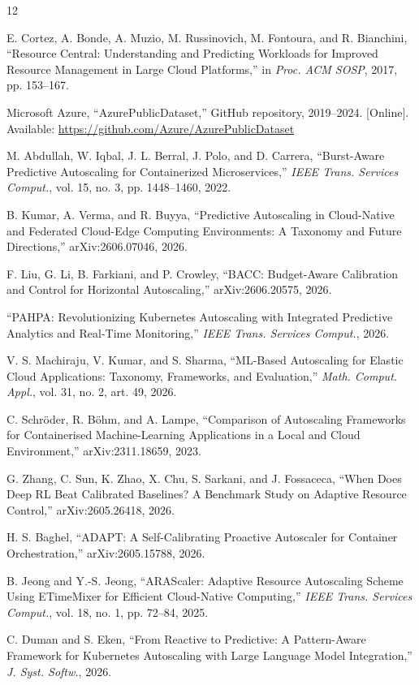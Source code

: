 \documentclass[journal]{IEEEtran}
\begin{document}
\begin{thebibliography}{12}

E. Cortez, A. Bonde, A. Muzio, M. Russinovich, M. Fontoura, and R. Bianchini, ``Resource Central: Understanding and Predicting Workloads for Improved Resource Management in Large Cloud Platforms,'' in \emph{Proc. ACM SOSP}, 2017, pp. 153--167.

Microsoft Azure, ``AzurePublicDataset,'' GitHub repository, 2019--2024. [Online]. Available: \url{https://github.com/Azure/AzurePublicDataset}

M. Abdullah, W. Iqbal, J. L. Berral, J. Polo, and D. Carrera, ``Burst-Aware Predictive Autoscaling for Containerized Microservices,'' \emph{IEEE Trans. Services Comput.}, vol. 15, no. 3, pp. 1448--1460, 2022.

B. Kumar, A. Verma, and R. Buyya, ``Predictive Autoscaling in Cloud-Native and Federated Cloud-Edge Computing Environments: A Taxonomy and Future Directions,'' arXiv:2606.07046, 2026.

F. Liu, G. Li, B. Farkiani, and P. Crowley, ``BACC: Budget-Aware Calibration and Control for Horizontal Autoscaling,'' arXiv:2606.20575, 2026.

``PAHPA: Revolutionizing Kubernetes Autoscaling with Integrated Predictive Analytics and Real-Time Monitoring,'' \emph{IEEE Trans. Services Comput.}, 2026.

V. S. Machiraju, V. Kumar, and S. Sharma, ``ML-Based Autoscaling for Elastic Cloud Applications: Taxonomy, Frameworks, and Evaluation,'' \emph{Math. Comput. Appl.}, vol. 31, no. 2, art. 49, 2026.

C. Schr\"oder, R. B\"ohm, and A. Lampe, ``Comparison of Autoscaling Frameworks for Containerised Machine-Learning Applications in a Local and Cloud Environment,'' arXiv:2311.18659, 2023.

G. Zhang, C. Sun, K. Zhao, X. Chu, S. Sarkani, and J. Fossaceca, ``When Does Deep RL Beat Calibrated Baselines? A Benchmark Study on Adaptive Resource Control,'' arXiv:2605.26418, 2026.

H. S. Baghel, ``ADAPT: A Self-Calibrating Proactive Autoscaler for Container Orchestration,'' arXiv:2605.15788, 2026.

B. Jeong and Y.-S. Jeong, ``ARAScaler: Adaptive Resource Autoscaling Scheme Using ETimeMixer for Efficient Cloud-Native Computing,'' \emph{IEEE Trans. Services Comput.}, vol. 18, no. 1, pp. 72--84, 2025.

C. Duman and S. Eken, ``From Reactive to Predictive: A Pattern-Aware Framework for Kubernetes Autoscaling with Large Language Model Integration,'' \emph{J. Syst. Softw.}, 2026.

\end{thebibliography}
\end{document}
